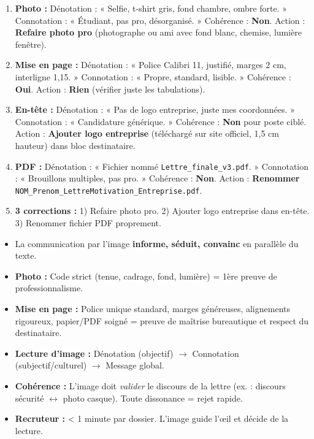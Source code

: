 \documentclass[11pt]{article}
\begin{document}
\begin{corrige}
\begin{enumerate}
    \item \textbf{Photo :} Dénotation : « Selfie, t-shirt gris, fond chambre, ombre forte. » Connotation : « Étudiant, pas pro, désorganisé. » Cohérence : \textbf{Non}. Action : \textbf{Refaire photo pro} (photographe ou ami avec fond blanc, chemise, lumière fenêtre).
    \item \textbf{Mise en page :} Dénotation : « Police Calibri 11, justifié, marges 2 cm, interligne 1,15. » Connotation : « Propre, standard, lisible. » Cohérence : \textbf{Oui}. Action : \textbf{Rien} (vérifier juste les tabulations).
    \item \textbf{En-tête :} Dénotation : « Pas de logo entreprise, juste mes coordonnées. » Connotation : « Candidature générique. » Cohérence : \textbf{Non} pour poste ciblé. Action : \textbf{Ajouter logo entreprise} (téléchargé sur site officiel, 1,5 cm hauteur) dans bloc destinataire.
    \item \textbf{PDF :} Dénotation : « Fichier nommé \texttt{Lettre\_finale\_v3.pdf}. » Connotation : « Brouillons multiples, pas pro. » Cohérence : \textbf{Non}. Action : \textbf{Renommer} \texttt{NOM\_Prenom\_LettreMotivation\_Entreprise.pdf}.
    \item \textbf{3 corrections :} 1) Refaire photo pro. 2) Ajouter logo entreprise dans en-tête. 3) Renommer fichier PDF proprement.
\end{enumerate}
\end{corrige}

\begin{aretenir}
\begin{itemize}
    \item La communication par l'image \textbf{informe, séduit, convainc} en parallèle du texte.
    \item \textbf{Photo :} Code strict (tenue, cadrage, fond, lumière) = 1ère preuve de professionnalisme.
    \item \textbf{Mise en page :} Police unique standard, marges généreuses, alignements rigoureux, papier/PDF soigné = preuve de maîtrise bureautique et respect du destinataire.
    \item \textbf{Lecture d'image :} Dénotation (objectif) $\rightarrow$ Connotation (subjectif/culturel) $\rightarrow$ Message global.
    \item \textbf{Cohérence :} L'image doit \emph{valider} le discours de la lettre (ex. : discours sécurité $\leftrightarrow$ photo casque). Toute dissonance = rejet rapide.
    \item \textbf{Recruteur :} < 1 minute par dossier. L'image guide l'œil et décide de la lecture.
\end{itemize}
\end{aretenir}
\end{document}
